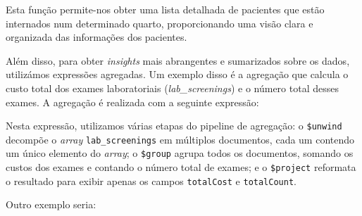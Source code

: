 Esta função permite-nos obter uma lista detalhada de pacientes que estão internados num determinado quarto, proporcionando uma visão clara e organizada das informações dos pacientes.

Além disso, para obter \textit{insights} mais abrangentes e sumarizados sobre os dados, utilizámos expressões agregadas. Um exemplo disso é a agregação que calcula o custo total dos exames laboratoriais (\textit{lab\_screenings}) e o número total desses exames. A agregação é realizada com a seguinte expressão:


Nesta expressão, utilizamos várias etapas do pipeline de agregação: o \texttt{\$unwind} decompõe o \textit{array} \texttt{lab\_screenings} em múltiplos documentos, cada um contendo um único elemento do \textit{array}; o \texttt{\$group} agrupa todos os documentos, somando os custos dos exames e contando o número total de exames; e o \texttt{\$project} reformata o resultado para exibir apenas os campos \texttt{totalCost} e \texttt{totalCount}.

Outro exemplo seria:


